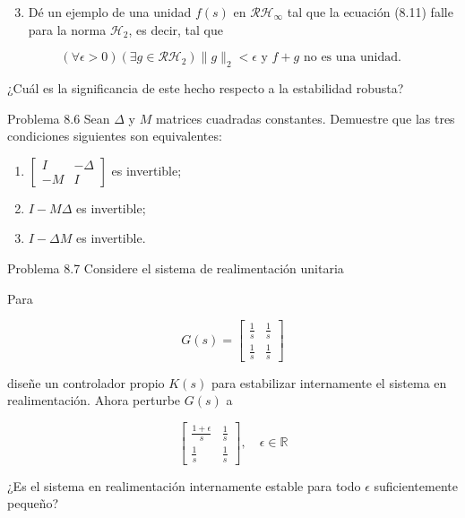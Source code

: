 \begin{enumerate}
  \setcounter{enumi}{2}
  \item Dé un ejemplo de una unidad $f(s)$ en $\mathcal{R} \mathcal{H}_{\infty}$ tal que la ecuación (8.11) falle para la norma $\mathcal{H}_{2}$, es decir, tal que
\end{enumerate}

$$
(\forall \epsilon>0)\left(\exists g \in \mathcal{R} \mathcal{H}_{2}\right)\|g\|_{2}<\epsilon \text { y } f+g \text { no es una unidad. }
$$

¿Cuál es la significancia de este hecho respecto a la estabilidad robusta?

Problema 8.6 Sean $\Delta$ y $M$ matrices cuadradas constantes. Demuestre que las tres condiciones siguientes son equivalentes:

\begin{enumerate}
  \item $\left[\begin{array}{cc}I & -\Delta \\ -M & I\end{array}\right]$ es invertible;
  \item $I-M \Delta$ es invertible;
  \item $I-\Delta M$ es invertible.
\end{enumerate}

Problema 8.7 Considere el sistema de realimentación unitaria


Para

$$
G(s)=\left[\begin{array}{cc}
\frac{1}{s} & \frac{1}{s} \\
\frac{1}{s} & \frac{1}{s}
\end{array}\right]
$$

diseñe un controlador propio $K(s)$ para estabilizar internamente el sistema en realimentación. Ahora perturbe $G(s)$ a

$$
\left[\begin{array}{cc}
\frac{1+\epsilon}{s} & \frac{1}{s} \\
\frac{1}{s} & \frac{1}{s}
\end{array}\right], \quad \epsilon \in \mathbb{R}
$$

¿Es el sistema en realimentación internamente estable para todo $\epsilon$ suficientemente pequeño?

